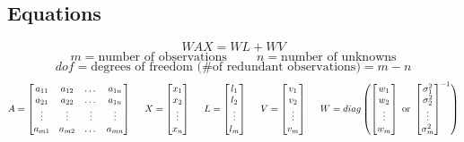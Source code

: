 \subsection{Equations}
\[
WAX=WL+WV 
\]
\[
m = \text{number of observations} \hspace{1cm} 
n = \text{number of unknowns}
\]
\[
dof = \text{degrees of freedom (\# of redundant observations)} = m-n
\]
\[
A = \begin{bmatrix}
a_{11} & a_{12} & \dots & a_{1n} \\
a_{21} & a_{22} & \dots & a_{1n} \\
\vdots & \vdots & \vdots& \vdots \\
a_{m1} & a_{m2} & \dots & a_{mn} \\
\end{bmatrix}
\hspace{0.5cm}
X = 
\begin{bmatrix}
x_1 \\ x_2 \\ \vdots \\ x_n
\end{bmatrix}
\hspace{0.5cm}
L = 
\begin{bmatrix}
l_1 \\ l_2 \\ \vdots \\ l_m
\end{bmatrix}
\hspace{0.5cm}
V = 
\begin{bmatrix}
v_1 \\ v_2 \\ \vdots \\ v_m
\end{bmatrix}
\hspace{0.5cm}
W = diag\left(
\begin{bmatrix}
w_1 \\ w_2 \\ \vdots \\ w_m
\end{bmatrix}
\text{ or }
\begin{bmatrix}
\sigma^2_1 \\ \sigma^2_2 \\ \vdots \\ \sigma^2_m
\end{bmatrix}^{-1}
\right)
\]
